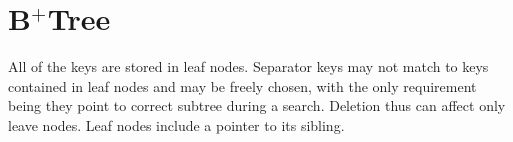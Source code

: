 \section{B$^+$Tree}

\begin{definition}[B$^+$Tree]
  All of the keys are stored in leaf nodes. Separator keys may not match to keys contained in leaf nodes and may be freely chosen, with the only requirement being they point to correct subtree during a search. Deletion thus can affect only leave nodes. Leaf nodes include a pointer to its sibling.
\end{definition}